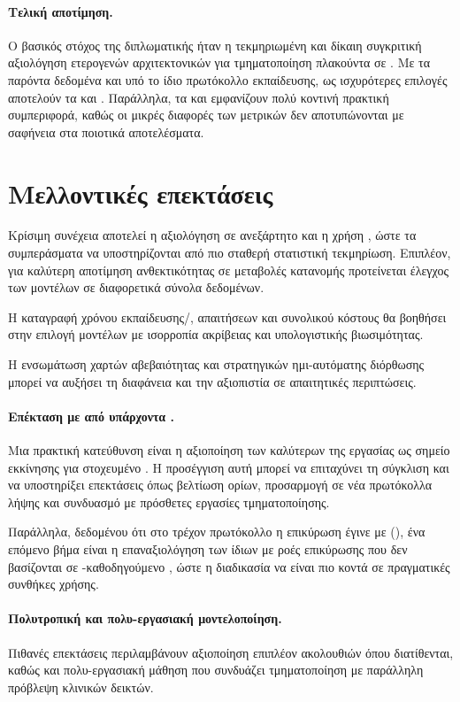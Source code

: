 \paragraph{Τελική αποτίμηση.}
Ο βασικός στόχος της διπλωματικής ήταν η τεκμηριωμένη και δίκαιη συγκριτική
αξιολόγηση ετερογενών αρχιτεκτονικών για τμηματοποίηση πλακούντα σε . 
Με τα παρόντα δεδομένα και υπό το ίδιο πρωτόκολλο εκπαίδευσης, ως ισχυρότερες επιλογές αποτελούν
τα  και . Παράλληλα, τα 
και  εμφανίζουν πολύ κοντινή πρακτική συμπεριφορά, καθώς οι μικρές
διαφορές των μετρικών δεν αποτυπώνονται με σαφήνεια στα ποιοτικά αποτελέσματα.

\section{Μελλοντικές επεκτάσεις}

Κρίσιμη συνέχεια αποτελεί η αξιολόγηση σε ανεξάρτητο  και η χρήση
, ώστε τα συμπεράσματα να υποστηρίζονται από πιο σταθερή
στατιστική τεκμηρίωση. Επιπλέον, για καλύτερη αποτίμηση ανθεκτικότητας σε μεταβολές κατανομής
προτείνεται έλεγχος των μοντέλων σε διαφορετικά σύνολα δεδομένων.

Η καταγραφή χρόνου εκπαίδευσης/, απαιτήσεων  και
συνολικού κόστους θα βοηθήσει στην επιλογή μοντέλων με ισορροπία ακρίβειας
και υπολογιστικής βιωσιμότητας.

Η ενσωμάτωση χαρτών αβεβαιότητας και στρατηγικών ημι-αυτόματης διόρθωσης
μπορεί να αυξήσει τη διαφάνεια και την αξιοπιστία σε απαιτητικές περιπτώσεις.

\paragraph{Επέκταση με  από υπάρχοντα .}
Μια πρακτική κατεύθυνση είναι η αξιοποίηση των καλύτερων
 της εργασίας ως σημείο εκκίνησης
για στοχευμένο . Η προσέγγιση αυτή μπορεί να
επιταχύνει τη σύγκλιση και να υποστηρίξει επεκτάσεις όπως βελτίωση ορίων,
προσαρμογή σε νέα πρωτόκολλα λήψης και συνδυασμό με πρόσθετες εργασίες
τμηματοποίησης.

Παράλληλα, δεδομένου ότι στο τρέχον πρωτόκολλο η επικύρωση έγινε με
 (), ένα επόμενο βήμα είναι η
επαναξιολόγηση των ίδιων  με ροές επικύρωσης που δεν βασίζονται
σε -καθοδηγούμενο , ώστε η διαδικασία να είναι πιο κοντά
σε πραγματικές συνθήκες χρήσης.

\paragraph{Πολυτροπική και πολυ-εργασιακή μοντελοποίηση.}
Πιθανές επεκτάσεις περιλαμβάνουν αξιοποίηση επιπλέον ακολουθιών  όπου
διατίθενται, καθώς και πολυ-εργασιακή μάθηση που συνδυάζει τμηματοποίηση με
παράλληλη πρόβλεψη κλινικών δεικτών.
